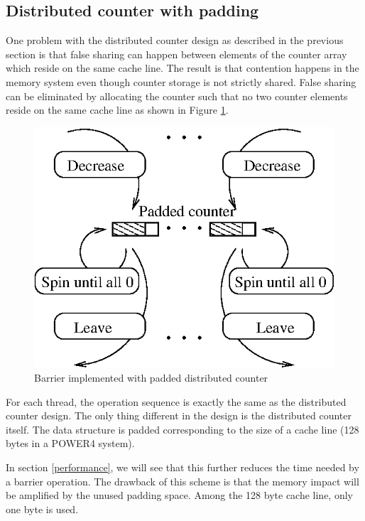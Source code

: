 \subsection{Distributed counter with padding}
\label{sec:distcounterpadding}

One problem with the distributed counter design as described in the
previous section is that false sharing can happen between elements of
the counter array which reside on the same cache line.  The result is that
contention happens in the memory system even though counter storage is not
strictly shared.  False
sharing can be eliminated by allocating the counter such that no two counter elements reside on the same cache line as shown in 
Figure \ref{fig:paddeddistcounter}.

\begin{figure}[htbp]
  \begin{center}
    \includegraphics[angle=0, scale=.85]{paddeddistcounter.eps}
    \caption{Barrier implemented with padded distributed counter}
    \label{fig:paddeddistcounter}
  \end{center}
\end{figure}

For each thread, the operation sequence is exactly the same as the
distributed counter design. The only thing different in the design is the
distributed counter itself. The data structure is padded corresponding
to the size of a cache line (128 bytes in a POWER4 system).

In section \ref{performance}, we will see that this further reduces the time
needed by a barrier operation. The drawback of this scheme is that
the memory impact will be amplified by the unused padding space. Among the 128 byte cache line, only
one byte is used.

